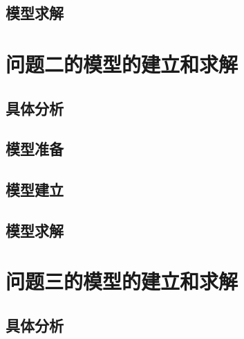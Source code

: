 \documentclass[withoutpreface,bwprint]{cumcmthesis}
\begin{document}
\subsection{模型求解}
















\newpage
\section{问题二的模型的建立和求解}
\subsection{具体分析}

\subsection{模型准备}

\subsection{模型建立}

\subsection{模型求解}




























\newpage
\section{问题三的模型的建立和求解}
\subsection{具体分析}
\end{document}
